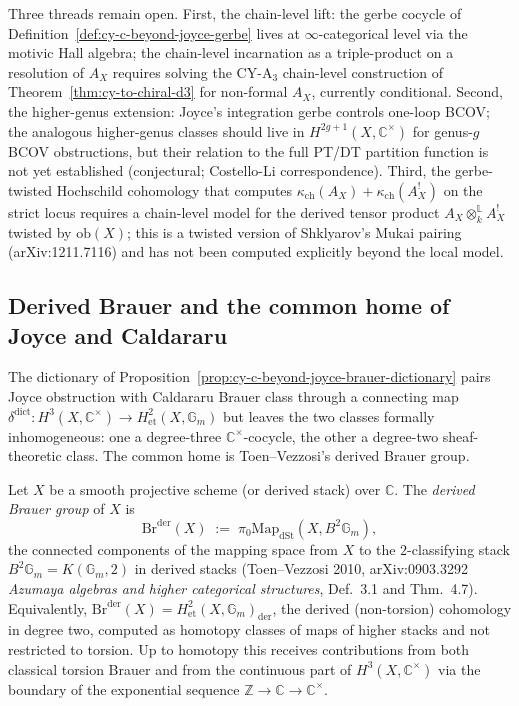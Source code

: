 \begin{remark}
\label{rem:cy-c-beyond-joyce-open-threads}
Three threads remain open. First, the chain-level lift: the gerbe cocycle
of Definition~\ref{def:cy-c-beyond-joyce-gerbe} lives at $\infty$-categorical
level via the motivic Hall algebra; the chain-level incarnation as a
triple-product on a resolution of $A_X$ requires solving the CY-A$_3$
chain-level construction of Theorem~\ref{thm:cy-to-chiral-d3} for
non-formal $A_X$, currently conditional. Second, the higher-genus extension:
Joyce's integration gerbe controls one-loop BCOV; the analogous
higher-genus classes should live in $H^{2g+1}(X, \mathbb{C}^\times)$ for
genus-$g$ BCOV obstructions, but their relation to the full PT/DT
partition function is not yet established (conjectural; Costello-Li
correspondence). Third, the gerbe-twisted Hochschild cohomology that computes
$\kappa_{\mathrm{ch}}(A_X) + \kappa_{\mathrm{ch}}(A_X^!)$ on the strict locus requires a chain-level
model for the derived tensor product $A_X \otimes^{\mathbb{L}}_k A_X^!$
twisted by $\mathrm{ob}(X)$; this is a twisted version of Shklyarov's
Mukai pairing (arXiv:1211.7116) and has not been computed explicitly
beyond the local model.
\end{remark}

\subsection{Derived Brauer and the common home of Joyce and Caldararu}
\label{subsec:cy-c-beyond-derived-brauer}

The dictionary of
Proposition~\ref{prop:cy-c-beyond-joyce-brauer-dictionary} pairs Joyce
obstruction with Caldararu Brauer class through a connecting map
$\delta^{\mathrm{dict}}: H^3(X, \mathbb{C}^\times) \to
H^2_{\mathrm{et}}(X, \mathbb{G}_m)$ but leaves the two classes formally
inhomogeneous: one a degree-three $\mathbb{C}^\times$-cocycle, the
other a degree-two sheaf-theoretic class. The common home is
Toen--Vezzosi's derived Brauer group.

\begin{definition}
\label{def:cy-c-beyond-derived-brauer}
Let $X$ be a smooth projective scheme (or derived stack) over
$\mathbb{C}$. The \emph{derived Brauer group} of $X$ is
\[
 \mathrm{Br}^{\mathrm{der}}(X)
 \;:=\; \pi_0 \mathrm{Map}_{\mathrm{dSt}}(X, B^2 \mathbb{G}_m),
\]
the connected components of the mapping space from $X$ to the
$2$-classifying stack $B^2 \mathbb{G}_m = K(\mathbb{G}_m, 2)$ in
derived stacks (Toen--Vezzosi 2010, arXiv:0903.3292 \emph{Azumaya
algebras and higher categorical structures}, Def.~3.1 and
Thm.~4.7). Equivalently,
$\mathrm{Br}^{\mathrm{der}}(X) = H^2_{\mathrm{et}}(X,
\mathbb{G}_m)_{\mathrm{der}}$, the derived (non-torsion) cohomology in
degree two, computed as homotopy classes of maps of higher stacks and
not restricted to torsion. Up to homotopy this receives contributions
from both classical torsion Brauer and from the continuous part of
$H^3(X, \mathbb{C}^\times)$ via the boundary of the exponential
sequence
$\mathbb{Z} \to \mathbb{C} \to \mathbb{C}^\times$.
\end{definition}

